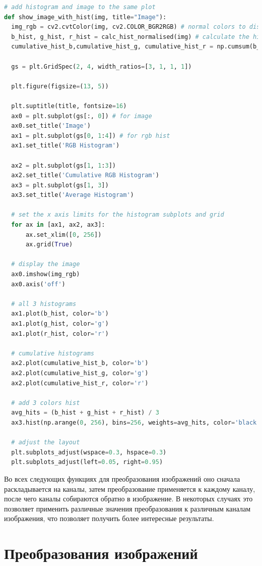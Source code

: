 \begin{lstlisting}[language=Python]
# add histogram and image to the same plot
def show_image_with_hist(img, title="Image"):
  img_rgb = cv2.cvtColor(img, cv2.COLOR_BGR2RGB) # normal colors to display
  b_hist, g_hist, r_hist = calc_hist_normalised(img) # calculate the histograms
  cumulative_hist_b,cumulative_hist_g, cumulative_hist_r = np.cumsum(b_hist), np.cumsum(g_hist), np.cumsum(r_hist) # calculate the cumulative histograms

  gs = plt.GridSpec(2, 4, width_ratios=[3, 1, 1, 1])

  plt.figure(figsize=(13, 5))

  plt.suptitle(title, fontsize=16)
  ax0 = plt.subplot(gs[:, 0]) # for image 
  ax0.set_title('Image')
  ax1 = plt.subplot(gs[0, 1:4]) # for rgb hist
  ax1.set_title('RGB Histogram')

  ax2 = plt.subplot(gs[1, 1:3])
  ax2.set_title('Cumulative RGB Histogram')
  ax3 = plt.subplot(gs[1, 3])
  ax3.set_title('Average Histogram')

  # set the x axis limits for the histogram subplots and grid
  for ax in [ax1, ax2, ax3]:
      ax.set_xlim([0, 256])
      ax.grid(True)

  # display the image
  ax0.imshow(img_rgb)
  ax0.axis('off')

  # all 3 histograms
  ax1.plot(b_hist, color='b')
  ax1.plot(g_hist, color='g')
  ax1.plot(r_hist, color='r')

  # cumulative histograms
  ax2.plot(cumulative_hist_b, color='b')
  ax2.plot(cumulative_hist_g, color='g')
  ax2.plot(cumulative_hist_r, color='r')

  # add 3 colors hist
  avg_hits = (b_hist + g_hist + r_hist) / 3
  ax3.hist(np.arange(0, 256), bins=256, weights=avg_hits, color='black')

  # adjust the layout
  plt.subplots_adjust(wspace=0.3, hspace=0.3)
  plt.subplots_adjust(left=0.05, right=0.95)  
\end{lstlisting}

Во всех следующих функциях для преобразования изображений оно сначала раскладывается на каналы, затем преобразование применяется к каждому каналу, после чего каналы собираются обратно в изображение. 
В некоторых случаях это позволяет применить различные значения преобразования к различным каналам изображения, что позволяет получить более интересные результаты.

\section{Преобразования изображений}

